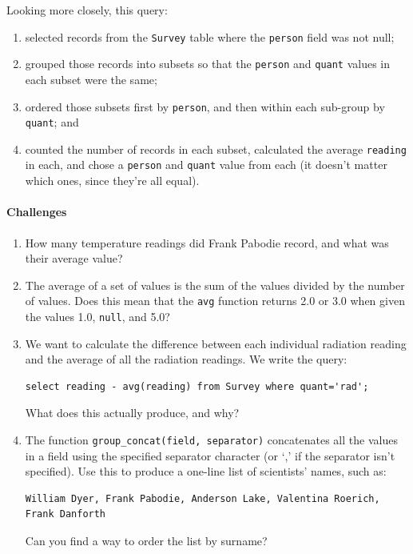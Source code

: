 \documentclass[]{book}
\begin{document}
Looking more closely, this query:

\begin{enumerate}
\item
  selected records from the \texttt{Survey} table where the
  \texttt{person} field was not null;
\item
  grouped those records into subsets so that the \texttt{person} and
  \texttt{quant} values in each subset were the same;
\item
  ordered those subsets first by \texttt{person}, and then within each
  sub-group by \texttt{quant}; and
\item
  counted the number of records in each subset, calculated the average
  \texttt{reading} in each, and chose a \texttt{person} and
  \texttt{quant} value from each (it doesn't matter which ones, since
  they're all equal).
\end{enumerate}

\mbox{}\paragraph{Challenges}

\begin{enumerate}
\item
  How many temperature readings did Frank Pabodie record, and what was
  their average value?
\item
  The average of a set of values is the sum of the values divided by the
  number of values. Does this mean that the \texttt{avg} function
  returns 2.0 or 3.0 when given the values 1.0, \texttt{null}, and 5.0?
\item
  We want to calculate the difference between each individual radiation
  reading and the average of all the radiation readings. We write the
  query:

\begin{verbatim}
select reading - avg(reading) from Survey where quant='rad';
\end{verbatim}

  What does this actually produce, and why?
\item
  The function \texttt{group\_concat(field, separator)} concatenates all
  the values in a field using the specified separator character (or `,'
  if the separator isn't specified). Use this to produce a one-line list
  of scientists' names, such as:

\begin{verbatim}
William Dyer, Frank Pabodie, Anderson Lake, Valentina Roerich, Frank Danforth
\end{verbatim}

  Can you find a way to order the list by surname?
\end{enumerate}
\end{document}
